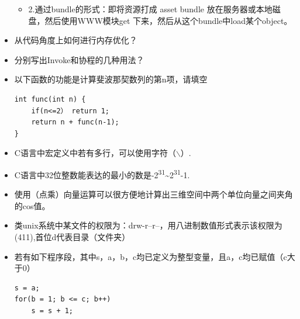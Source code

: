 \documentclass[9pt, b5paper]{article}
\begin{document}
\begin{itemize}
\begin{itemize}
\item 2.通过bundle的形式：即将资源打成 asset bundle 放在服务器或本地磁盘，然后使用WWW模块get 下来，然后从这个bundle中load某个object。
\end{itemize}
\item 从代码角度上如何进行内存优化？
\item 分别写出Invoke和协程的几种用法？
\item 以下函数的功能是计算斐波那契数列的第n项，请填空
\begin{verbatim}
int func(int n) {
    if(n<=2） return 1;
    return n + func(n-1);
}
\end{verbatim}
\item C语言中宏定义中若有多行，可以使用字符（$\backslash$）.
\item C语言中32位整数能表达的最小的数是-2\textsuperscript{31}\textasciitilde{}2\textsuperscript{31}-1.
\item 使用（点乘）向量运算可以很方便地计算出三维空间中两个单位向量之间夹角的cos值。
\item 类unix系统中某文件的权限为：drw-r–r–，用八进制数值形式表示该权限为(411),首位d代表目录（文件夹）
\item 若有如下程序段，其中s，a，b，c均已定义为整型变量，且a，c均已赋值（c大于0）
\begin{verbatim}
s = a;
for(b = 1; b <= c; b++)
    s = s + 1;
\end{verbatim}
\end{itemize}
\end{document}
